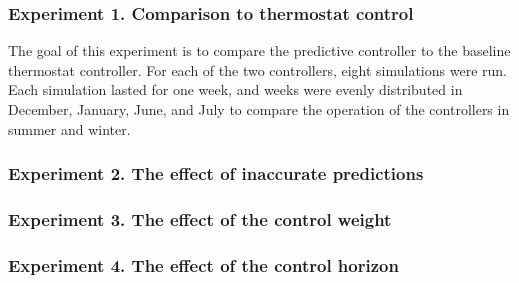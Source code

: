 \subsubsection{Experiment 1. Comparison to thermostat control}

The goal of this experiment is to compare the predictive controller to the baseline thermostat controller.
For each of the two controllers, eight simulations were run.
Each simulation lasted for one week, and weeks were evenly distributed in December, January, June, and July to compare the operation of the controllers in summer and winter.

\subsubsection{Experiment 2. The effect of inaccurate predictions}

\subsubsection{Experiment 3. The effect of the control weight}

\subsubsection{Experiment 4. The effect of the control horizon}

